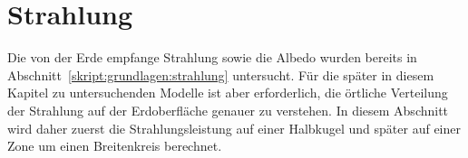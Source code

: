 %
%
%
\section{Strahlung\label{section:strahlung}}
Die von der Erde empfange Strahlung sowie die Albedo wurden bereits in
Abschnitt~\ref{skript:grundlagen:strahlung} untersucht.
Für die später in diesem Kapitel zu untersuchenden Modelle ist aber
erforderlich, die örtliche Verteilung der Strahlung auf der Erdoberfläche
genauer zu verstehen.
In diesem Abschnitt wird daher zuerst die Strahlungsleistung auf einer
Halbkugel und später auf einer Zone um einen Breitenkreis berechnet.


